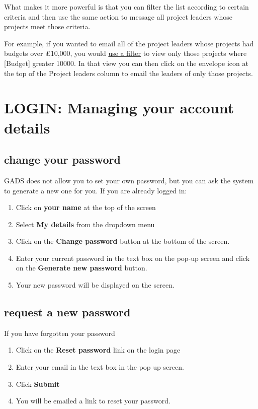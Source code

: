 \documentclass{ctrlo-int-toc}
\begin{document}
\begin{admin}
What makes it more powerful is that you can filter the list according to certain criteria and then use the same action to message all project leaders whose projects meet those criteria. 

For example, if you wanted to email all of the project leaders whose projects had budgets over {\pounds}10,000, you would \hyperref[subsec:viewstofilter]{use a filter} to view only those projects where [Budget] greater 10000. In that view you can then click on the envelope icon at the top of the Project leaders column to email the leaders of only those projects. 


\end{admin}

\clearpage\section[LOGIN: Managing your account details]{LOGIN: Managing your account details}
\subsection[change your password]{change your password}
GADS does not allow you to set your own password, but you can ask the system to generate a new one for you. If you are already logged in:

\begin{enumerate}
\item Click on \textbf{your name} at the top of the screen
\item Select \textbf{My details} from the dropdown menu
\item Click on the \textbf{Change password} button at the bottom of the screen. 
\item Enter your current password in the text box on the pop-up screen and click on the \textbf{Generate new password} button.
\item Your new password will be displayed on the screen. 
\end{enumerate}
\subsection[request a new password]{request a new password}
If you have forgotten your password

\begin{enumerate}
\item Click on the \textbf{Reset password} link on the login page
\item Enter your email in the text box in the pop up screen.
\item Click \textbf{Submit}
\item You will be emailed a link to reset your password. 
\end{enumerate}
\end{document}
